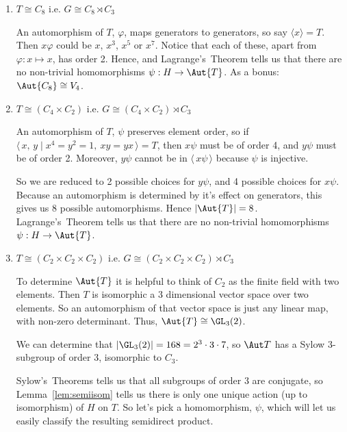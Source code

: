 \begin{enumerate}
    \item \(T \cong C_8\) i.e. \(G \cong C_8 \rtimes C_3\)

        An automorphism of \(T\), \(\varphi\), maps generators to generators, so say \(\langle x \rangle = T\).
        Then \(x\varphi\) could be \(x\), \(x^3\), \(x^5\) or \(x^7\).
        Notice that each of these, apart from \(\varphi:x \mapsto x\), has order 2.
        Hence, and Lagrange's~Theorem tells us that there are no non-trivial homomorphisms \(\psi:H \to \Aut{T}\).
        As a bonus: \(\Aut{C_8} \cong V_4\).

    \item \(T \cong (C_4 \times C_2)\) i.e. \(G \cong (C_4 \times C_2) \rtimes C_3\)

        An automorphism of \(T\), \(\psi\) preserves element order, so if \(\langle\,x,\,y \mid x^4 = y^2 = 1,\ xy =
        yx\,\rangle = T\), then \(x\psi\) must be of order 4, and \(y\psi\) must be of order 2.
        Moreover, \(y\psi\) cannot be in \(\langle\,x\psi\,\rangle\) because \(\psi\) is injective.

        So we are reduced to 2 possible choices for \(y\psi\), and 4 possible choices for \(x\psi\).
        Because an automorphism is determined by it's effect on generators, this gives us 8 possible automorphisms.
        Hence \(|\Aut{T}| = 8\).
        Lagrange's~Theorem tells us that there are no non-trivial homomorphisms \(\psi:H \to \Aut{T}\).

    \item \(T \cong (C_2 \times C_2 \times C_2)\) i.e. \(G \cong (C_2 \times C_2 \times C_2) \rtimes C_3\)

        To determine \(\Aut{T}\) it is helpful to think of \(C_2\) as the finite field with two elements.
        Then \(T\) is isomorphic a 3 dimensional vector space over two elements.
        So an automorphism of that vector space is just any linear map, with non-zero determinant.
        Thus, \(\Aut{T} \cong \GL_3(2)\).

        We can determine that \(|\GL_3(2)| = 168 = 2^3 \cdot 3 \cdot 7\), so \(\Aut T\) has a Sylow 3-subgroup of order
        3, isomorphic to \(C_3\).

        Sylow's~Theorems tells us that all subgroups of order 3 are conjugate, so Lemma~\ref{lem:semiisom} tells us
        there is only one unique action (up to isomorphism) of \(H\) on \(T\).
        So let's pick a homomorphism, \(\psi\), which will let us easily classify the resulting semidirect product.


\end{enumerate}
